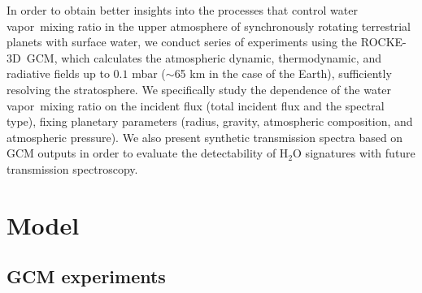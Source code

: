 \documentclass[11pt,numberedappendix,twocolappendix,]{emulateapj}
\def\water{H$_2$O }
\def\modelE{ROCKE-3D}
\def\memo#1{\color{red}$[${\bf #1}$]$ \color{black}}
\newcommand{\yf}[1]{{\color{orange}#1}}
\newcommand{\wv}{water vapor\ }
\begin{document}

\yf{In order to obtain better insights into the processes that control \wv mixing ratio in the upper atmosphere of synchronously rotating terrestrial planets with surface water, we conduct series of experiments using the \modelE \ GCM, which calculates the atmospheric dynamic, thermodynamic, and radiative fields up to $0.1$ mbar ($\sim $65 km in the case of the Earth), sufficiently resolving the stratosphere. }
We specifically study the dependence of the \wv mixing ratio on the incident flux (total incident flux and the spectral type), fixing planetary parameters (radius, gravity, atmospheric composition, and atmospheric pressure). 
We also present synthetic transmission spectra based on GCM outputs in order to evaluate the detectability of \water signatures with future transmission spectroscopy. 



\section{Model}
\label{s:model}

\subsection{GCM experiments}
\end{document}
